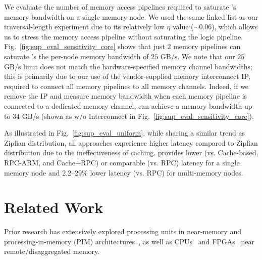  We evaluate the number of \pulse memory access pipelines required to saturate \pulse's memory bandwidth on a single memory node. We used the same linked list as our traversal-length experiment due to its relatively low $\eta$ value ($\sim$$0.06$), which allows us to stress the memory access pipeline without saturating the logic pipeline. Fig.~\ref{fig:sup_eval_sensitivity_core} shows that just $2$ memory pipelines can saturate \pulse's the per-node memory bandwidth of $25$ GB/s. We note that our $25$ GB/s limit does not match the hardware-specified memory channel bandwidths; this is primarily due to our use of the vendor-supplied memory interconnect IP, required to connect all memory pipelines to all memory channels. Indeed, if we remove the IP and measure memory bandwidth when each memory pipeline is connected to a dedicated memory channel, \pulse can achieve a memory bandwidth up to $34$ GB/s (shown as \pulse w/o Interconnect in Fig.~\ref{fig:sup_eval_sensitivity_core}). 

 As illustrated in Fig.~\ref{fig:sup_eval_uniform}, while sharing a similar trend as Zipfian distribution, all approaches experience higher latency compared to Zipfian distribution due to the ineffectiveness of caching. \pulse provides lower (vs. Cache-based, RPC-ARM, and Cache$+$RPC) or comparable (vs. RPC) latency for a single memory node and $2.2$--$29\%$ lower latency (vs. RPC) for multi-memory nodes. 





\section{Related Work}
Prior research has extensively explored processing units in near-memory and processing-in-memory (PIM) architectures~\cite{ahn2015scalable, asghari2016chameleon, dai2018graphh, schuiki2018scalable, mutlu2019processing, lockerman2020livia, tu2022redcim, devic2022_PIM, wang2022_Nearstream, xie2023mpu, mutlu2022modern, oliveira2022accelerating, eckert2022eidetic, chi2016prime, seshadri2017simple, kwon2019_TensorDIMM, boroumand2019_codna, cho2020_data, ke2020_RecNMP, wang2021stream, xie2021spacea, ke2021near, singh2021fpga, olgun2022pidram, dai2022dimmining, gu2020ipim, gomez2023evaluating, walkers, impica}, as well as CPUs~\cite{storagefunctions, splinter, aifm, kayak_nsdi_21, storm_systor_19, zhang2022_teleport} and FPGAs~\cite{clio, strom} near remote/disaggregated memory.

